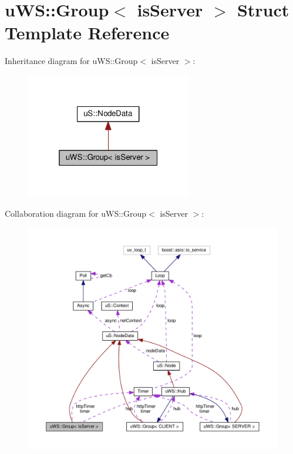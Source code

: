 \hypertarget{structu_w_s_1_1_group}{}\section{u\+WS\+:\+:Group$<$ is\+Server $>$ Struct Template Reference}
\label{structu_w_s_1_1_group}


Inheritance diagram for u\+WS\+:\+:Group$<$ is\+Server $>$\+:
\nopagebreak
\begin{figure}[H]
\begin{center}
\leavevmode
\includegraphics[width=205pt]{structu_w_s_1_1_group__inherit__graph}
\end{center}
\end{figure}


Collaboration diagram for u\+WS\+:\+:Group$<$ is\+Server $>$\+:
\nopagebreak
\begin{figure}[H]
\begin{center}
\leavevmode
\includegraphics[width=350pt]{structu_w_s_1_1_group__coll__graph}
\end{center}
\end{figure}
